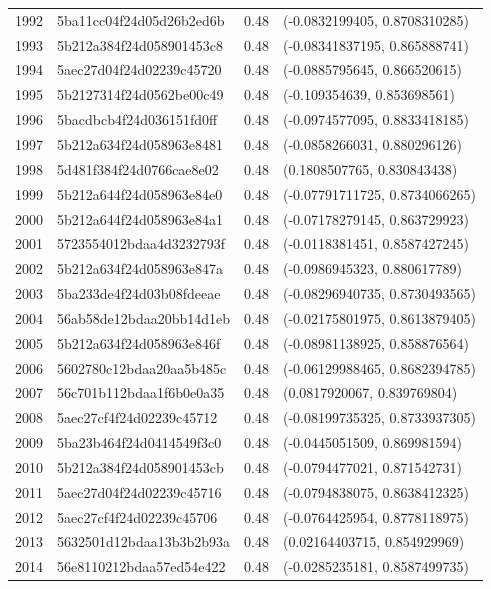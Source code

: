 \begin{table}[ht]
\begin{tabular}{rlrl}
  1992 & 5ba11cc04f24d05d26b2ed6b & 0.48 & (-0.0832199405, 0.8708310285) \\ 
  1993 & 5b212a384f24d058901453c8 & 0.48 & (-0.08341837195, 0.865888741) \\ 
  1994 & 5aec27d04f24d02239c45720 & 0.48 & (-0.0885795645, 0.866520615) \\ 
  1995 & 5b2127314f24d0562be00c49 & 0.48 & (-0.109354639, 0.853698561) \\ 
  1996 & 5bacdbcb4f24d036151fd0ff & 0.48 & (-0.0974577095, 0.8833418185) \\ 
  1997 & 5b212a634f24d058963e8481 & 0.48 & (-0.0858266031, 0.880296126) \\ 
  1998 & 5d481f384f24d0766cae8e02 & 0.48 & (0.1808507765, 0.830843438) \\ 
  1999 & 5b212a644f24d058963e84e0 & 0.48 & (-0.07791711725, 0.8734066265) \\ 
  2000 & 5b212a644f24d058963e84a1 & 0.48 & (-0.07178279145, 0.863729923) \\ 
  2001 & 5723554012bdaa4d3232793f & 0.48 & (-0.0118381451, 0.8587427245) \\ 
  2002 & 5b212a634f24d058963e847a & 0.48 & (-0.0986945323, 0.880617789) \\ 
  2003 & 5ba233de4f24d03b08fdeeae & 0.48 & (-0.08296940735, 0.8730493565) \\ 
  2004 & 56ab58de12bdaa20bb14d1eb & 0.48 & (-0.02175801975, 0.8613879405) \\ 
  2005 & 5b212a634f24d058963e846f & 0.48 & (-0.08981138925, 0.858876564) \\ 
  2006 & 5602780c12bdaa20aa5b485c & 0.48 & (-0.06129988465, 0.8682394785) \\ 
  2007 & 56c701b112bdaa1f6b0e0a35 & 0.48 & (0.0817920067, 0.839769804) \\ 
  2008 & 5aec27cf4f24d02239c45712 & 0.48 & (-0.08199735325, 0.8733937305) \\ 
  2009 & 5ba23b464f24d0414549f3c0 & 0.48 & (-0.0445051509, 0.869981594) \\ 
  2010 & 5b212a384f24d058901453cb & 0.48 & (-0.0794477021, 0.871542731) \\ 
  2011 & 5aec27d04f24d02239c45716 & 0.48 & (-0.0794838075, 0.8638412325) \\ 
  2012 & 5aec27cf4f24d02239c45706 & 0.48 & (-0.0764425954, 0.8778118975) \\ 
  2013 & 5632501d12bdaa13b3b2b93a & 0.48 & (0.02164403715, 0.854929969) \\ 
  2014 & 56e8110212bdaa57ed54e422 & 0.48 & (-0.0285235181, 0.8587499735) \\ 

\end{tabular}
\end{table}
